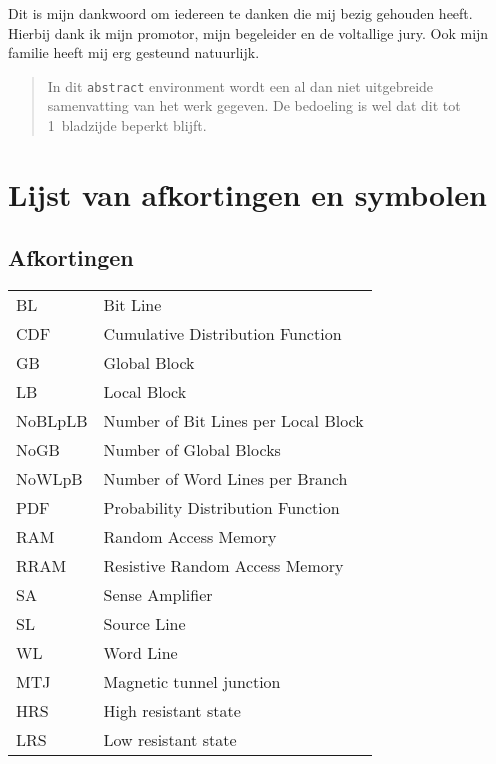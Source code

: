 \documentclass[master=elt,masteroption=eg]{kulemt}
\begin{document}
\begin{preface}
  Dit is mijn dankwoord om iedereen te danken die mij bezig gehouden heeft.
  Hierbij dank ik mijn promotor, mijn begeleider en de voltallige jury.
  Ook mijn familie heeft mij erg gesteund natuurlijk.
\end{preface}

\tableofcontents*

\begin{abstract}
  In dit \texttt{abstract} environment wordt een al dan niet uitgebreide
  samenvatting van het werk gegeven. De bedoeling is wel dat dit tot
  1~bladzijde beperkt blijft.

  \lipsum[1]
\end{abstract}

\listoffiguresandtables
\chapter{Lijst van afkortingen en symbolen}
\section*{Afkortingen}
\begin{flushleft}
  \renewcommand{\arraystretch}{1.1}
  \begin{tabularx}{\textwidth}{@{}p{18mm}X@{}}
    BL   & Bit Line \\
    CDF & Cumulative Distribution Function  \\
    GB & Global Block \\
    LB & Local Block \\
    NoBLpLB & Number of Bit Lines per Local Block \\
    NoGB & Number of Global Blocks \\
    NoWLpB & Number of Word Lines per Branch \\
    PDF & Probability Distribution Function \\
    RAM   & Random Access Memory \\
    RRAM & Resistive Random Access Memory \\
    SA & Sense Amplifier \\
    SL & Source Line \\
    WL  & Word Line \\
    MTJ & Magnetic tunnel junction \\
    HRS & High resistant state \\
    LRS & Low resistant state  \\
  \end{tabularx}
\end{flushleft}
\end{document}
